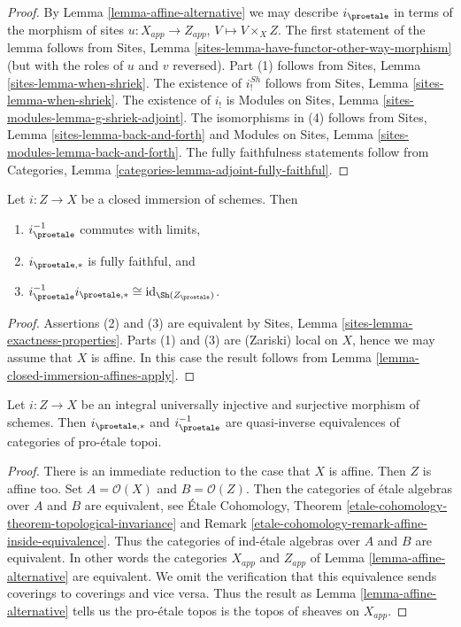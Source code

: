 \begin{proof}
By Lemma \ref{lemma-affine-alternative} we may describe $i_\proetale$ in
terms of the morphism of sites
$u : X_{app} \to Z_{app}$, $V \mapsto V \times_X Z$.
The first statement of the lemma follows from
Sites, Lemma \ref{sites-lemma-have-functor-other-way-morphism}
(but with the roles of $u$ and $v$ reversed).
Part (1) follows from Sites, Lemma \ref{sites-lemma-when-shriek}.
The existence of $i^{Sh}_!$ follows from
Sites, Lemma \ref{sites-lemma-when-shriek}.
The existence of $i_!$ is
Modules on Sites, Lemma \ref{sites-modules-lemma-g-shriek-adjoint}.
The isomorphisms in (4) follows from
Sites, Lemma \ref{sites-lemma-back-and-forth}
and Modules on Sites, Lemma \ref{sites-modules-lemma-back-and-forth}.
The fully faithfulness statements follow from
Categories, Lemma \ref{categories-lemma-adjoint-fully-faithful}.
\end{proof}

\begin{lemma}
\label{lemma-closed-immersion}
Let $i : Z \to X$ be a closed immersion of schemes. Then
\begin{enumerate}
\item $i_\proetale^{-1}$ commutes with limits,
\item $i_{\proetale, *}$ is fully faithful, and
\item $i_\proetale^{-1}i_{\proetale, *} \cong \text{id}_{\Sh(Z_\proetale)}$.
\end{enumerate}
\end{lemma}

\begin{proof}
Assertions (2) and (3) are equivalent by
Sites, Lemma \ref{sites-lemma-exactness-properties}.
Parts (1) and (3) are (Zariski) local on $X$, hence we may assume that
$X$ is affine. In this case the result follows from
Lemma \ref{lemma-closed-immersion-affines-apply}.
\end{proof}

\begin{lemma}
\label{lemma-thickening}
Let $i : Z \to X$ be an integral universally injective and surjective morphism
of schemes. Then
$i_{\proetale, *}$ and $i_\proetale^{-1}$ are quasi-inverse
equivalences of categories of pro-\'etale topoi.
\end{lemma}

\begin{proof}
There is an immediate reduction to the case that $X$ is affine.
Then $Z$ is affine too. Set $A = \mathcal{O}(X)$ and $B = \mathcal{O}(Z)$.
Then the categories of \'etale algebras over
$A$ and $B$ are equivalent, see 
\'Etale Cohomology, Theorem
\ref{etale-cohomology-theorem-topological-invariance} and
Remark \ref{etale-cohomology-remark-affine-inside-equivalence}.
Thus the categories of ind-\'etale algebras over $A$ and $B$ are
equivalent. In other words the categories $X_{app}$ and $Z_{app}$
of Lemma \ref{lemma-affine-alternative} are equivalent.
We omit the verification
that this equivalence sends coverings to coverings and vice versa.
Thus the result as Lemma \ref{lemma-affine-alternative}
tells us the pro-\'etale topos is the topos of sheaves on $X_{app}$.
\end{proof}

